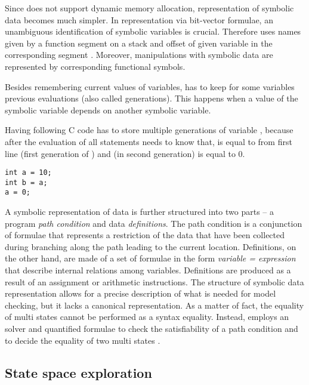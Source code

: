 Since \SymDIVINE does not support dynamic memory allocation, representation
of symbolic data becomes much simpler. In representation via bit-vector
\SMT formulae, an unambiguous identification of symbolic variables is crucial.
Therefore \SymDIVINE uses names given by a function
segment on a stack and offset of given variable in the corresponding segment \cite{Mrazek16}.
Moreover, manipulations with symbolic data are represented by corresponding functional symbols.

Besides remembering current values of variables, \SymDIVINE has to keep for
some variables previous evaluations (also called generations). This happens when
a value of the symbolic variable depends on another symbolic variable.

\begin{example}\label{ex:gen}
Having following C code \SymDIVINE has to store multiple generations of variable
, because after the evaluation of all statements \SymDIVINE needs to know
that,  is equal to  from first line (first generation of
) and  (in second generation) is equal to $0$.

\begin{verbatim}
int a = 10;
int b = a;
a = 0;
\end{verbatim}

\end{example}

A symbolic representation of data is further structured into two parts -- a
program \emph{path condition} and data \emph{definitions}. The path condition is a
conjunction of formulae that represents a restriction of the data that have been
collected during branching along the path leading to the current location.
Definitions, on the other hand, are made of a set of formulae in the form
\emph{variable = expression} that describe internal relations among variables.
Definitions are produced as a result of an assignment or arithmetic
instructions. The structure of symbolic data representation allows for a
precise description of what is needed for model checking, but it lacks a
canonical representation. As a matter of fact, the equality of multi states
cannot be performed as a syntax equality. Instead, \SymDIVINE employs an \SMT
solver and quantified formulae to check the satisfiability of a path condition
and to decide the equality of two multi states \cite{Mrazek16}.

\subsection{State space exploration}

